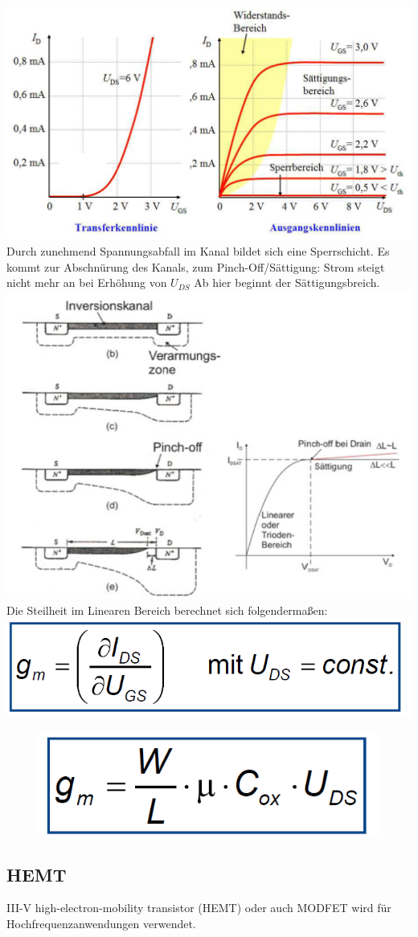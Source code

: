 		\includegraphics[width=0.8\linewidth]{Kapitel/Kap06/TransferundAusgangskennlinie}
		Durch zunehmend Spannungsabfall im Kanal bildet sich eine Sperrschicht. Es kommt zur Abschnürung des Kanals, zum Pinch-Off/Sättigung: Strom steigt nicht mehr an bei Erhöhung von $U_{DS}$
		\newline
		Ab hier beginnt der Sättigungsbreich.
		\newline
		\includegraphics[width=0.6\linewidth]{Kapitel/Kap06/PinchOfff}
		\newline
		Die Steilheit im Linearen Bereich berechnet sich folgendermaßen: \includegraphics[width=0.3\linewidth]{Kapitel/Kap06/gm}
		\begin{figure}
			\centering
			\includegraphics[width=0.3\linewidth]{Kapitel/Kap06/gm1}
			\caption{}
			\label{fig:gm1}
		\end{figure}
\subsection{HEMT}	
	III-V high-electron-mobility transistor (HEMT) oder auch MODFET wird für Hochfrequenzanwendungen verwendet.
	
